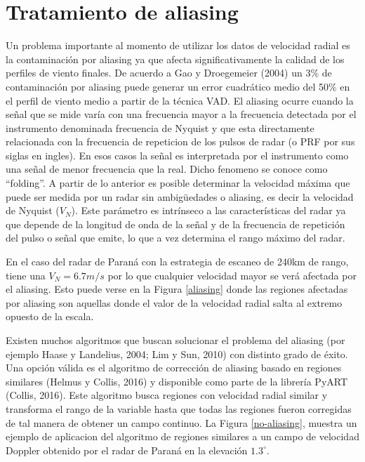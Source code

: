 \documentclass[12pt,spanish,oneside, a4paper]{book}
\begin{document}
\section{\texorpdfstring{Tratamiento de aliasing
\label{sec-aliasing}}{Tratamiento de aliasing }}\label{tratamiento-de-aliasing}

Un problema importante al momento de utilizar los datos de velocidad
radial es la contaminación por aliasing ya que afecta significativamente
la calidad de los perfiles de viento finales. De acuerdo a Gao y
Droegemeier (2004) un 3\% de contaminación por aliasing puede generar un
error cuadrático medio del 50\% en el perfil de viento medio a partir de
la técnica VAD. El aliasing ocurre cuando la señal que se mide varía con
una frecuencia mayor a la frecuencia detectada por el instrumento
denominada frecuencia de Nyquist y que esta directamente relacionada con
la frecuencia de repeticion de los pulsos de radar (o PRF por sus siglas
en ingles). En esos casos la señal es interpretada por el instrumento
como una señal de menor frecuencia que la real. Dicho fenomeno se conoce
como ``folding''. A partir de lo anterior es posible determinar la
velocidad máxima que puede ser medida por un radar sin ambigüedades o
aliasing, es decir la velocidad de Nyquist (\(V_N\)). Este parámetro es
intrínseco a las características del radar ya que depende de la longitud
de onda de la señal y de la frecuencia de repetición del pulso o señal
que emite, lo que a vez determina el rango máximo del radar.

En el caso del radar de Paraná con la estrategia de escaneo de 240km de
rango, tiene una \(V_N = 6.7 m/s\) por lo que cualquier velocidad mayor
se verá afectada por el aliasing. Esto puede verse en la Figura
\ref{aliasing} donde las regiones afectadas por aliasing son aquellas
donde el valor de la velocidad radial salta al extremo opuesto de la
escala.

Existen muchos algoritmos que buscan solucionar el problema del aliasing
(por ejemplo Haase y Landelius, 2004; Lim y Sun, 2010) con distinto
grado de éxito. Una opción válida es el algoritmo de corrección de
aliasing basado en regiones similares (Helmus y Collis, 2016) y
disponible como parte de la librería PyART (Collis, 2016). Este
algoritmo busca regiones con velocidad radial similar y transforma el
rango de la variable hasta que todas las regiones fueron corregidas de
tal manera de obtener un campo continuo. La Figura \ref{no-aliasing},
muestra un ejemplo de aplicacion del algoritmo de regiones similares a
un campo de velocidad Doppler obtenido por el radar de Paraná en la
elevación \(1.3^{\circ}\).
\end{document}
